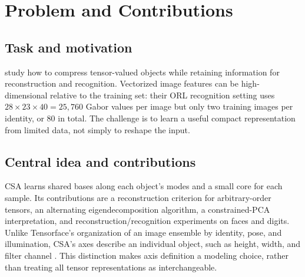 \section{Problem and Contributions}
\label{sec:overview}
\subsection{Task and motivation}
\citet{xu2008csa} study how to compress tensor-valued objects while retaining
information for reconstruction and recognition. Vectorized image features can
be high-dimensional relative to the training set: their ORL recognition setting
uses $28\times23\times40=25{,}760$ Gabor values per image but only two training
images per identity, or 80 in total. The challenge is to learn a useful compact
representation from limited data, not simply to reshape the input.

\subsection{Central idea and contributions}
CSA learns shared bases along each object's modes and a small core for each
sample. Its contributions are a reconstruction criterion for arbitrary-order
tensors, an alternating eigendecomposition algorithm, a constrained-PCA
interpretation, and reconstruction/recognition experiments on faces and digits.
Unlike Tensorface's organization of an image ensemble by identity, pose, and
illumination, CSA's axes describe an individual object, such as height, width,
and filter channel \citep[Sec.~III-A]{xu2008csa}. This distinction makes axis
definition a modeling choice, rather than treating all tensor representations
as interchangeable.
